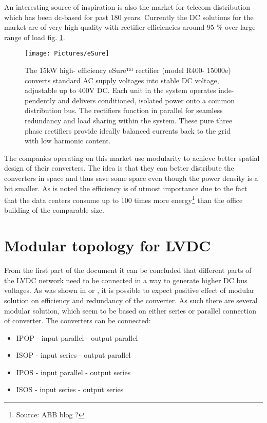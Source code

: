 \documentclass[]{scrartcl}
\begin{document}
An interesting source of inspiration is also the market for telecom distribution which has been dc-based for past 180 years. Currently the DC solutions for the market are of very high quality with rectifier efficiencies around 95 \% over large range of load fig. \ref{fig:eSure}.
\begin{figure}[h!]
	\centering
	\texttt{[image: Pictures/eSure]}
	\caption{The 15kW high- efficiency eSure™ rectifier (model R400- 15000e) converts standard AC supply voltages into stable DC voltage, adjustable up to 400V DC. Each unit in the system operates inde- pendently and delivers conditioned, isolated power onto a common distribution bus. The rectifiers function in parallel for seamless redundancy and load sharing within the system. These pure three phase rectifiers provide ideally balanced currents back to the grid with low harmonic content.}
	\label{fig:eSure}
\end{figure}
The companies operating on this market use modularity to achieve better spatial design of their converters. The idea is that they can better distribute the converters in space and thus save some space even though the power density is a bit smaller. As is noted the efficiency is of utmost importance due to the fact that the data centers consume up to 100 times more energy\footnote{Source: ABB blog ?} than the office building of the comparable size. 




\section{Modular topology for LVDC}

From the first part of the document it can be concluded that different parts of the LVDC network need to be connected in a way to generate higher DC bus voltages. As was shown in \cite{Yang2014} or \cite{Quartarone}, it is possible to expect positive effect of modular solution on efficiency and redundancy of the converter. As such there are several modular solution, which seem to be based on either series or parallel connection of converter. The converters can be connected:
\begin{itemize}
	\item IPOP - input parallel - output parallel
	\item ISOP - input series - output parallel
	\item IPOS - input parallel - output series
	\item ISOS - input series - output series
\end{itemize}
\end{document}
